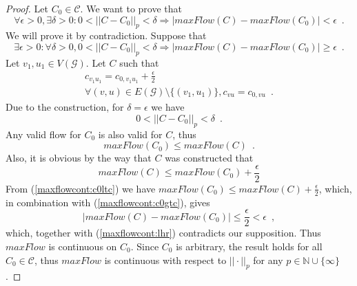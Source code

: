 \begin{proof}
   Let $C_0 \in \mathcal{C}$. We want to prove that
   \begin{equation*}
      \forall \epsilon > 0, \exists \delta > 0 : 0 < ||C - C_0||_p < \delta
      \Rightarrow |maxFlow\left(C\right) - maxFlow\left(C_0\right)| < \epsilon \enspace.
   \end{equation*}
   We will prove it by contradiction. Suppose that
   \begin{equation*}
      \exists \epsilon > 0 : \forall \delta > 0, 0 < ||C - C_0||_p < \delta
      \Rightarrow |maxFlow\left(C\right) - maxFlow\left(C_0\right)| \geq \epsilon \enspace.
   \end{equation*}
   Let $v_1, u_1 \in V\left(\mathcal{G}\right)$. Let $C$ such that
   \begin{equation*}
   \begin{gathered}
      c_{v_1u_1} = c_{0,v_1u_1} + \frac{\epsilon}{2} \\
      \forall \left(v, u\right) \in E\left(\mathcal{G}\right) \setminus \{\left(v_1, u_1\right)\}, c_{vu} = c_{0,vu}
      \enspace.
   \end{gathered}
   \end{equation*}
   Due to the construction, for $\delta = \epsilon$ we have
   \begin{equation}
   \label{maxflowcont:lhr}
      0 < ||C - C_0||_p < \delta \enspace.
   \end{equation}
   Any valid flow for $C_0$ is also valid for $C$, thus
   \begin{equation}
   \label{maxflowcont:c0ltc}
      maxFlow\left(C_0\right) \leq maxFlow\left(C\right) \enspace.
   \end{equation}
   Also, it is obvious by the way that $C$ was constructed that
   \begin{equation}
   \label{maxflowcont:c0gtc}
      maxFlow\left(C\right) \leq maxFlow\left(C_0\right) + \frac{\epsilon}{2}
   \end{equation}
   From (\ref{maxflowcont:c0ltc}) we have $maxFlow\left(C_0\right) \leq maxFlow\left(C\right) + \frac{\epsilon}{2}$, which,
   in combination with (\ref{maxflowcont:c0gtc}), gives 
   \begin{equation*}
      |maxFlow\left(C\right) - maxFlow\left(C_0\right)| \leq \frac{\epsilon}{2} < \epsilon \enspace,
   \end{equation*}
   which, together with (\ref{maxflowcont:lhr}) contradicts our supposition. Thus $maxFlow$ is continuous on $C_0$. Since
   $C_0$ is arbitrary, the result holds for all $C_0 \in \mathcal{C}$, thus $maxFlow$ is continuous with respect to
   $||\cdot||_p$ for any $p \in \mathbb{N} \cup \{\infty\}$.
\end{proof}
